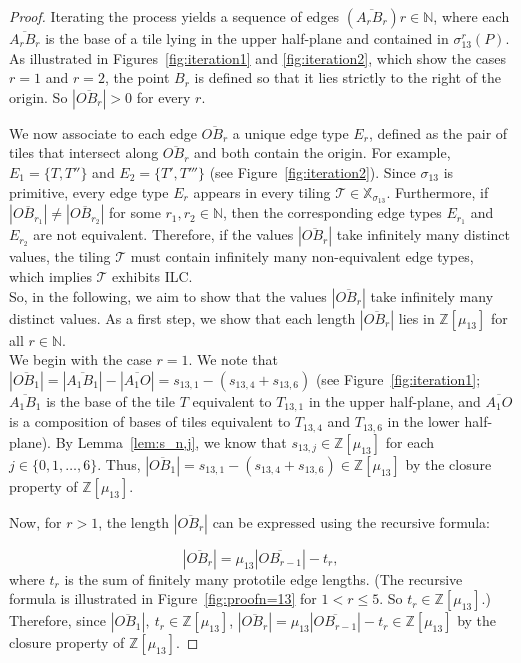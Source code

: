 \begin{proof}
Iterating the process yields a sequence of edges $(\overline{A_rB_r}){r \in \mathbb{N}}$, where each $\overline{A_rB_r}$ is the base of a tile lying in the upper half-plane and contained in $\sigma_{13}^r(P)$. As illustrated in Figures~\ref{fig:iteration1} and \ref{fig:iteration2}, which show the cases $r = 1$ and $r = 2$, the point $B_r$ is defined so that it lies strictly to the right of the origin. So $|\overline{OB_r}| > 0$ for every $r$.

We now associate to each edge $\overline{OB_r}$ a unique edge type $E_r$, defined as the pair of tiles that intersect along $\overline{OB_r}$ and both contain the origin. For example, $E_1 = \{T, T''\}$ and $E_2 = \{T', T'''\}$ (see Figure~\ref{fig:iteration2}). Since $\sigma_{13}$ is primitive, every edge type $E_r$ appears in every tiling $\mathcal{T} \in \mathbb{X}_{\sigma_{13}}$. Furthermore, if $|\overline{OB_{r_1}}| \neq |\overline{OB_{r_2}}|$ for some $r_1, r_2 \in \mathbb{N}$, then the corresponding edge types $E_{r_1}$ and $E_{r_2}$ are not equivalent. Therefore, if the values $|\overline{OB_r}|$ take infinitely many distinct values, the tiling $\mathcal{T}$ must contain infinitely many non-equivalent edge types, which implies $\mathcal{T}$ exhibits ILC. \\

So, in the following, we aim to show that the values $|\overline{OB_r}|$ take infinitely many distinct values. As a first step, we show that each length $|\overline{OB_r}|$ lies in $\mathbb{Z}[\mu_{13}]$ for all $r \in \mathbb{N}$. \\

We begin with the case $r=1$. We note that $|\overline{OB_1}|=|\overline{A_1B_1}|-|\overline{A_1O}|=s_{13,1}-(s_{13,4}+s_{13,6} )$ (see Figure~\ref{fig:iteration1}; $\overline{A_1B_1}$ is the base of the tile $T$ equivalent to $T_{13,1}$ in the upper half-plane, and $\overline{A_1O}$ is a composition of bases of tiles equivalent to $T_{13,4}$ and $T_{13,6}$ in the lower half-plane). By Lemma~\ref{lem:s_n,j}, we know that $s_{13,j} \in \mathbb{Z}[\mu_{13}]$ for each $j \in \{0,1,\ldots,6\}$. Thus, $|\overline{OB_1}| =s_{13,1}-(s_{13,4}+s_{13,6} ) \in \mathbb{Z}[\mu_{13}]$ by the closure property of $\mathbb{Z}[\mu_{13}]$.  

Now, for $r>1$, the length $|\overline{OB_r}|$ can be expressed using the recursive formula:

\begin{equation}
|\overline{OB_r}|=\mu_{13} |\overline{OB_{r-1}}|-t_r,           
\label{eq:recursion}
\end{equation}
\noindent where $t_r$ is the sum of finitely many prototile edge lengths. (The recursive formula is illustrated in Figure~\ref{fig:proofn=13} for $1< r \leq5$.  So $t_r \in \mathbb{Z}[\mu_{13}]$.) Therefore, since $|\overline{OB_1}|, \ t_r \in \mathbb{Z}[\mu_{13}]$, $|\overline{OB_r}|=\mu_{13}|\overline{OB_{r-1}}|-t_{r} \in \mathbb{Z}[\mu_{13}]$ by the closure property of $\mathbb{Z}[\mu_{13}]$.


\end{proof}
